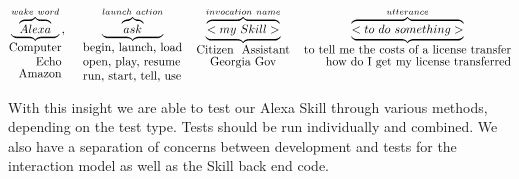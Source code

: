 \[
	\underbrace{\overbrace{Alexa}^{wake \  word}}_{\shortstack[r]{Computer\\Echo\\Amazon}} %
	, \ \ \ \ 
	\underbrace{\overbrace{ask}^{launch \ action}}_{\shortstack[l]{begin, launch, load\\open, play, resume\\run, start, tell, use}}
	\ \ \ 
	\underbrace{\overbrace{<my \ Skill>}^{invocation \ name}}_{\shortstack{Citizen \ Assistant \\ Georgia Gov}}
	\ \ \
	\underbrace{\overbrace{<to \ do \ something>}^{utterance}}_{\shortstack[r]{to tell me the costs of a license transfer\\how do I get my license transferred}}
\]






With this insight we are able to test our Alexa Skill through various methods, depending on the test type. Tests should be run individually and combined. We also have a separation of concerns between development and tests for the interaction model as well as the Skill back end code.



